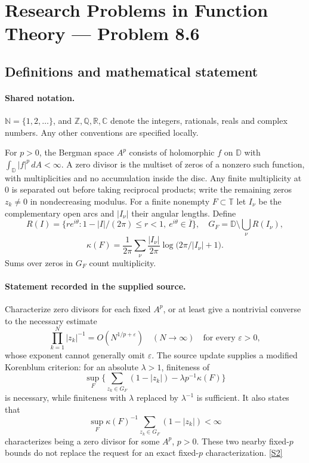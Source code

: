 \documentclass[11pt]{article}
\newcommand{\sref}[2]{\hyperlink{source:#1:#2}{[S#2]}}
\begin{document}
\section{Research Problems in Function Theory — Problem 8.6}\label{statement}

\subsection{Definitions and mathematical statement}

\paragraph{Shared notation.}$\mathbb N=\{1,2,\ldots\}$, and $\mathbb Z,\mathbb Q,\mathbb R,\mathbb C$ denote the integers, rationals, reals and complex numbers. Any other conventions are specified locally.


For $p>0$, the Bergman space $A^p$ consists of holomorphic $f$ on $\mathbb D$ with $\int_{\mathbb D}|f|^p\,dA<\infty$. A zero divisor is the multiset of zeros of a nonzero such function, with multiplicities and no accumulation inside the disc. Any finite multiplicity at $0$ is separated out before taking reciprocal products; write the remaining zeros $z_k\ne0$ in nondecreasing modulus. For a finite nonempty $F\subset\mathbb T$ let $I_\nu$ be the complementary open arcs and $|I_\nu|$ their angular lengths. Define
\[R(I)=\{re^{i\theta}:1-|I|/(2\pi)\le r<1,\ e^{i\theta}\in\overline I\},
\quad G_F=\mathbb D\setminus\bigcup_\nu R(I_\nu),
\]
\[\kappa(F)=\frac1{2\pi}\sum_\nu\frac{|I_\nu|}{2\pi}
\log\big(2\pi/|I_\nu|+1\big).
\]
Sums over zeros in $G_F$ count multiplicity.
\paragraph{Statement recorded in the supplied source.}
Characterize zero divisors for each fixed $A^p$, or at least give a nontrivial converse to the necessary estimate
\[\prod_{k=1}^N|z_k|^{-1}=O(N^{1/p+\varepsilon})\quad(N\to\infty)
\quad\text{for every }\varepsilon>0,
\]
whose exponent cannot generally omit $\varepsilon$. The source update supplies a modified Korenblum criterion: for an absolute $\lambda>1$, finiteness of
\[\sup_F\big\{\sum_{z_k\in G_F}(1-|z_k|)-\lambda p^{-1}\kappa(F)\big\}
\]
is necessary, while finiteness with $\lambda$ replaced by $\lambda^{-1}$ is sufficient. It also states that
\[\sup_F\kappa(F)^{-1}\sum_{z_k\in G_F}(1-|z_k|)<\infty
\]
characterizes being a zero divisor for some $A^p$, $p>0$. These two nearby fixed-$p$ bounds do not replace the request for an exact fixed-$p$ characterization. \sref{statement}{2}
\end{document}
